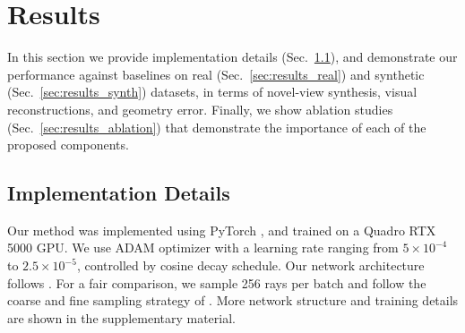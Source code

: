 
\section{Results}
\label{sec:results}
In this section we provide implementation details (Sec.~\ref{sec:results_impl_details}), and demonstrate our performance against baselines on real (Sec.~\ref{sec:results_real}) %
and synthetic (Sec.~\ref{sec:results_synth}) %
datasets, in terms of novel-view synthesis, visual reconstructions, and geometry error. Finally, we show ablation studies (Sec.~\ref{sec:results_ablation}) that demonstrate the importance of each of the proposed components. 

\subsection{Implementation Details}
\label{sec:results_impl_details}
Our method was implemented using PyTorch \cite{paszke2019pytorch}, and trained on a Quadro RTX 5000 GPU. We use ADAM optimizer \cite{kingma2014adam} with a learning rate ranging from $5 \times 10^{-4}$ to $2.5 \times 10^{-5}$, controlled by cosine decay schedule. Our network architecture follows \cite{yariv2020multiview, mildenhall2020nerf}. For a fair comparison, we sample 256 rays per batch and follow the coarse and fine sampling strategy of \cite{wang2021neus}. More network structure and training details are shown in the supplementary material. 


